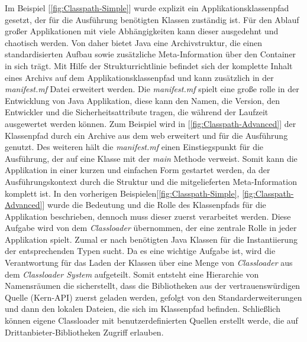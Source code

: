 Im Beispiel [\ref{fig:Classpath-Simple}] wurde explizit ein Applikationsklassenpfad gesetzt, der für die Ausführung benötigten Klassen zuständig ist. Für den Ablauf großer Applikationen mit viele Abhängigkeiten kann dieser ausgedehnt und chaotisch werden. Von daher bietet Java eine Archivstruktur, die einen standardisierten Aufbau sowie zusätzliche Meta-Information über den Container in sich trägt. Mit Hilfe der Strukturrichtlinie befindet sich der komplette Inhalt eines Archivs auf dem Applikationsklassenpfad und kann zusätzlich in der \textit{manifest.mf} Datei erweitert werden. Die \textit{manifest.mf} spielt eine große rolle in der Entwicklung von Java Applikation, diese kann den Namen, die Version, den Entwickler und die Sicherheitsattribute tragen, die während der Laufzeit ausgewertet werden können. Zum Beispiel wird in [\ref{fig:Classpath-Advanced}] der Klassenpfad durch ein Archive aus dem web erweitert und für die Ausführung genutzt. Des weiteren hält die \textit{manifest.mf} einen Einstiegspunkt für die Ausführung, der auf eine Klasse mit der \textit{main} Methode verweist. Somit kann die Applikation in einer kurzen und einfachen Form gestartet werden, da der Ausführungskontext durch die Struktur und die mitgelieferten Meta-Information komplett ist.
\bigbreak
In den vorherigen Beispielen[\ref{fig:Classpath-Simple}, \ref{fig:Classpath-Advanced}] wurde die Bedeutung und die Rolle des Klassenpfads für die Applikation beschrieben, dennoch muss dieser zuerst verarbeitet werden. Diese Aufgabe wird von dem \textit{Classloader} übernommen, der eine zentrale Rolle in jeder Applikation spielt. Zumal er nach benötigten Java Klassen für die Instantiierung der entsprechenden Typen sucht. Da es eine wichtige Aufgabe ist, wird die Verantwortung für das Laden der Klassen über eine Menge von \textit{Classloader} aus dem \textit{Classloader System} aufgeteilt. Somit entsteht eine Hierarchie von Namensräumen die sicherstellt, dass die Bibliotheken aus der  vertrauenswürdigen Quelle (Kern-API) zuerst geladen werden, gefolgt von den Standarderweiterungen und dann den lokalen Dateien, die sich im Klassenpfad befinden. Schließlich können eigene Classloader mit benutzerdefinierten Quellen erstellt werde, die auf Drittanbieter-Bibliotheken Zugriff erlauben.
